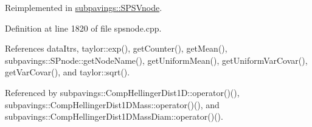 \-Reimplemented in \hyperlink{classsubpavings_1_1SPSVnode_a3b56f3b8a024ab6929087e803e7af765}{subpavings\-::\-S\-P\-S\-Vnode}.



\-Definition at line 1820 of file spsnode.\-cpp.



\-References data\-Itrs, taylor\-::exp(), get\-Counter(), get\-Mean(), subpavings\-::\-S\-Pnode\-::get\-Node\-Name(), get\-Uniform\-Mean(), get\-Uniform\-Var\-Covar(), get\-Var\-Covar(), and taylor\-::sqrt().



\-Referenced by subpavings\-::\-Comp\-Hellinger\-Dist1\-D\-::operator()(), subpavings\-::\-Comp\-Hellinger\-Dist1\-D\-Mass\-::operator()(), and subpavings\-::\-Comp\-Hellinger\-Dist1\-D\-Mass\-Diam\-::operator()().


